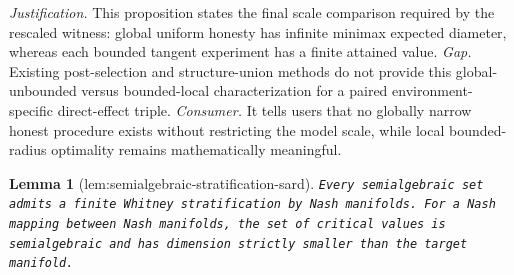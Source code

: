 \documentclass{article}
\newtheorem{lemma}{Lemma}
\begin{document}
\par\smallskip\noindent \textit{Justification.} This proposition states the final scale comparison required by the rescaled witness: global uniform honesty has infinite minimax expected diameter, whereas each bounded tangent experiment has a finite attained value. \textit{Gap.} Existing post-selection and structure-union methods do not provide this global-unbounded versus bounded-local characterization for a paired environment-specific direct-effect triple. \textit{Consumer.} It tells users that no globally narrow honest procedure exists without restricting the model scale, while local bounded-radius optimality remains mathematically meaningful.

\begin{lemma}[lem:semialgebraic-stratification-sard]\label{lem:semialgebraic-stratification-sard}
\texttt{Every semialgebraic set admits a finite Whitney stratification by Nash manifolds. For a Nash mapping between Nash manifolds,\allowbreak{} the set of critical values is semialgebraic and has dimension strictly smaller than the target manifold.}
\end{lemma}
\end{document}
